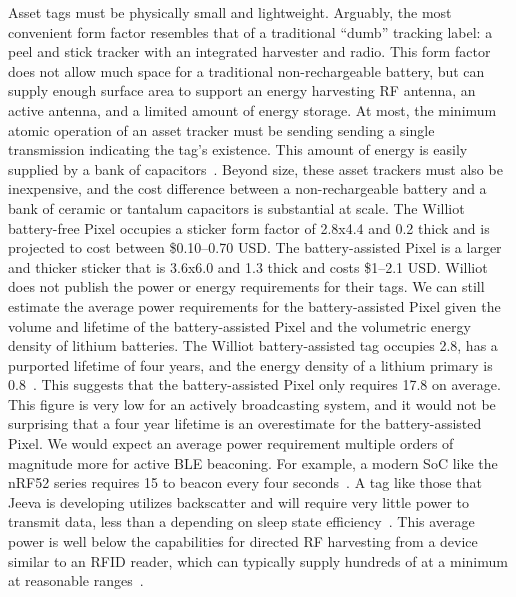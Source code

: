 Asset tags must be physically small and lightweight.
Arguably, the most convenient form factor resembles that of a traditional ``dumb'' tracking label: a peel and stick tracker with an integrated harvester and radio.
This form factor does not allow much space for a traditional non-rechargeable battery, but can supply enough surface area to support an energy harvesting RF antenna, an active antenna, and a limited amount of energy storage.
At most, the minimum atomic operation of an asset tracker must be sending
sending a single transmission indicating the tag's existence.
This amount of energy is easily supplied by a bank of capacitors~\cite{debruin2013monjolo, campbellEnergy14, yervaGrafting12}.
Beyond size, these asset trackers must also be inexpensive, and the cost difference between a non-rechargeable battery and a bank of ceramic or tantalum capacitors is substantial at scale.
The Williot battery-free Pixel occupies a sticker form factor of 2.8x4.4\ssi{\centi\meter} and 0.2\ssi{\milli\meter} thick and is projected to cost between \$0.10--0.70 USD.
The battery-assisted Pixel is a larger and thicker sticker that is 3.6x6.0\ssi{\centi\meter} and 1.3\ssi{\milli\meter} thick and costs \$1--2.1 USD.
Williot does not publish the power or energy requirements for their tags. 
We can still estimate the average power requirements for the battery-assisted Pixel
given the volume and lifetime of the battery-assisted Pixel and the volumetric energy density of lithium batteries. 
The Williot battery-assisted tag occupies 2.8\ssi{\centi\meter\cubed}, has a purported lifetime of four years, and the energy density of a lithium primary is 0.8\ssi[per-mode=symbol]{\Wh\per\centi\meter\cubed}~\cite{tuna2016energy}. 
This suggests that the battery-assisted Pixel only requires 17.8\ssi{\nano\watt} on average.
This figure is very low for an actively broadcasting system, and it would not be surprising that a four year lifetime is an overestimate for the battery-assisted Pixel.
We would expect an average power requirement multiple orders of magnitude more for active BLE beaconing. For example, a modern SoC like the nRF52 series requires 15\ssi{\micro\watt} to beacon every four seconds~\cite{nrf52Power}. 
A tag like those that Jeeva is developing utilizes backscatter and will require very little power to transmit data, less than a \ssi{\micro\watt} depending on sleep state efficiency~\cite{jeevawireless}. This average power is well below the capabilities for directed RF harvesting from a device similar to an RFID reader, which can typically supply hundreds of \ssi{\micro\watt} at a minimum at reasonable ranges~\cite{sample2008design}.

